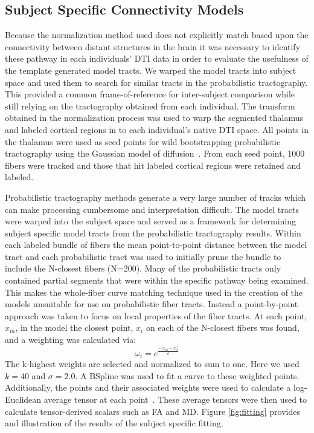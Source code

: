 \subsection{Subject Specific Connectivity Models}
Because the normalization method used does not explicitly match based upon the connectivity between distant structures in the brain it was necessary to identify these pathway in each individuals' DTI data in order to evaluate the usefulness of the template generated model tracts. We warped the model tracts into subject space and used them to search for similar tracts in the probabilistic tractography. This provided a common frame-of-reference for inter-subject comparison while still relying on the tractography obtained from each individual. The transform obtained in the normalization process was used to warp the segmented thalamus and labeled cortical regions in to each individual's native DTI space. All points in the thalamus were used as seed points for wild bootstrapping probabilistic tractography using the Gaussian model of diffusion~\cite{Jones06,Whitcher08}. From each seed point, 1000 fibers were tracked and those that hit labeled cortical regions were retained and labeled. 

Probabilistic tractography methods generate a very large number of tracks which can make processing cumbersome and interpretation difficult. The model tracts were warped into the subject space and served as a framework for determining subject specific model tracts from the probabilistic tractography results. Within each labeled bundle of fibers the mean point-to-point distance between the model tract and each probabilistic tract was used to initially prune the bundle to include the N-closest fibers (N=200). Many of the probabilistic tracts only contained partial segments that were within the specific pathway being examined. This makes the whole-fiber curve matching technique used in the creation of the models unsuitable for use on probabilistic fiber tracts. Instead a point-by-point approach was taken to focus on local properties of the fiber tracts. At each point, $x_m$, in the model the closest point, $x_i$ on each of the N-closest fibers was found, and a weighting was calculated via:
\begin{equation}
\omega_i = e^{\frac{-|x_m - x_i|}{\sigma}}
\end{equation}
The k-highest weights are selected and normalized to sum to one. Here we used $k=40$ and $\sigma=2.0$. A BSpline was used to fit a curve to these weighted points. Additionally, the points and their associated weights were used to calculate a log-Euclidean average tensor at each point~\cite{Arsigny06}. These average tensors were then used to calculate tensor-derived scalars such as FA and MD. Figure \ref{fig:fitting} provides and illustration of the results of the subject specific fitting.

